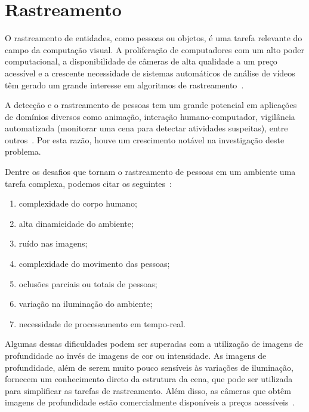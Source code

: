 \section {Rastreamento}	
\label{sec:rastreamento}

	O rastreamento de entidades, como pessoas ou objetos, é uma tarefa relevante do campo da computação visual. A proliferação de computadores com um alto poder computacional, a disponibilidade de câmeras de alta qualidade a um preço acessível e a crescente necessidade de sistemas automáticos de análise de vídeos têm gerado um grande interesse em algoritmos de rastreamento~\cite{yilmaz}.


	A detecção e o rastreamento de pessoas tem um grande potencial em aplicações de domínios diversos como animação, interação humano-computador, vigilância automatizada (monitorar uma cena para detectar atividades suspeitas), entre outros~\cite{yilmaz}. Por esta razão, houve um crescimento notável na investigação deste problema.

	Dentre os desafios que tornam o rastreamento de pessoas em um ambiente uma tarefa complexa, podemos citar os seguintes~\cite{yilmaz}:

		\begin{enumerate}
			\item complexidade do corpo humano;
			\item alta dinamicidade do ambiente;
			\item ruído nas imagens;
			\item complexidade do movimento das pessoas;
			\item oclusões parciais ou totais de pessoas;
			\item variação na iluminação do ambiente;
			\item necessidade de processamento em tempo-real.
		\end{enumerate}

	Algumas dessas dificuldades podem ser superadas com a utilização de imagens de profundidade ao invés de imagens de cor ou intensidade. As imagens de profundidade, além de serem muito pouco sensíveis às variações de iluminação, fornecem um conhecimento direto da estrutura da cena, que pode ser utilizada para simplificar as tarefas de rastreamento. Além disso, as câmeras que obtêm imagens de profundidade estão comercialmente disponíveis a preços acessíveis~\cite{nikos}.

